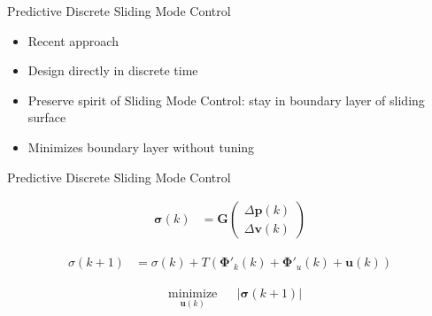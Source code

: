 \documentclass[12pt,svgnames,table,draft=false]{beamer}
\newcommand{\mbf}[1]{\mathbf{#1}}
\providecommand{\mbf}[1]{\mathbf{#1}}
\newcommand{\idxSample}{{\ensuremath{k}}}
\begin{document}
\usebackgroundtemplate{
}

\begin{frame}{Predictive Discrete Sliding Mode Control}
\centering
\begin{tcolorbox}[colback=blue!5!white,colframe=blue!75!black,title=PDSMC]
\begin{itemize}
\item Recent approach \cite{houda2013new}
\item Design directly in discrete time
\item Preserve spirit of Sliding Mode Control: stay in boundary layer of sliding surface
\item Minimizes boundary layer without tuning
\end{itemize}
\end{tcolorbox}
\end{frame}

\begin{frame}{Predictive Discrete Sliding Mode Control}
\centering
\begin{tcolorbox}[colback=blue!5!white,colframe=blue!75!black,title=What it looks like, width=.8\paperwidth]

\begin{align}
\mbf{\sigma}(\idxSample) &= \mbf{G}
\begin{pmatrix}
\Delta \mbf{p}(\idxSample)\\
\Delta \mbf{v}(\idxSample)
\end{pmatrix} \nonumber
\end{align}

\begin{align}
{{\sigma}}(\idxSample+1)
&=
{{\sigma}}(\idxSample)
+
T(
\mbf{\Phi}'_k(\idxSample) + \mbf{\Phi}'_u(\idxSample) + \mbf{u}(\idxSample))
\nonumber
\end{align}

\begin{align}
& \underset{\mbf{u}(\idxSample)}{\text{minimize}}
& & |\mbf{\sigma}(\idxSample+1)| \nonumber 
\end{align}

\end{tcolorbox}

\end{frame}
\end{document}
